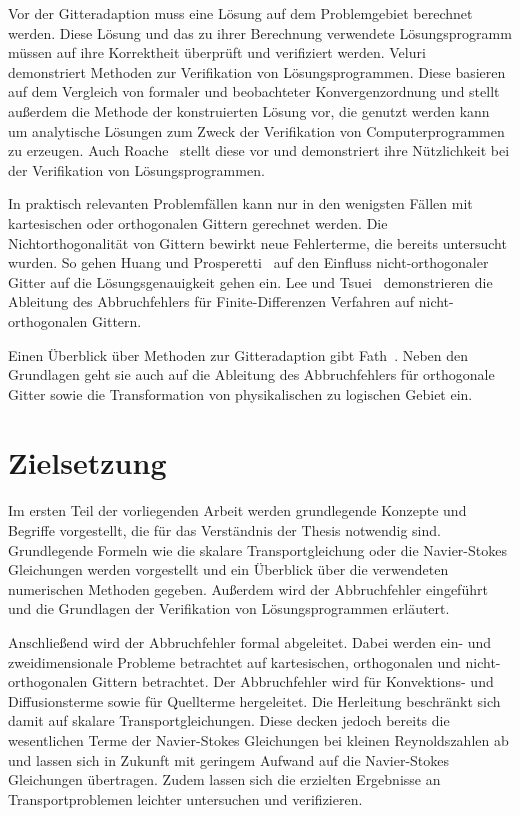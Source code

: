 Vor der Gitteradaption muss eine Lösung auf dem Problemgebiet berechnet werden. Diese
Lösung und das zu ihrer Berechnung verwendete Lösungsprogramm müssen
auf ihre Korrektheit überprüft und verifiziert werden. Veluri~\cite{veluri} demonstriert
Methoden zur Verifikation von Lösungsprogrammen. Diese basieren auf dem Vergleich von formaler und beobachteter
Konvergenzordnung und stellt außerdem die Methode der konstruierten Lösung vor, die genutzt werden kann
um analytische Lösungen zum Zweck der Verifikation von Computerprogrammen zu erzeugen.
Auch Roache~\cite{roache} stellt diese vor und demonstriert ihre Nützlichkeit bei der Verifikation von
Lösungsprogrammen.

In praktisch relevanten Problemfällen kann nur in den wenigsten Fällen mit
kartesischen oder orthogonalen Gittern gerechnet werden. Die Nichtorthogonalität
von Gittern bewirkt neue Fehlerterme, die bereits untersucht wurden. So gehen
Huang und Prosperetti~\cite{grid_ortho} auf den Einfluss nicht-orthogonaler Gitter
auf die Lösungsgenauigkeit gehen 
ein. Lee und Tsuei~\cite{lee} demonstrieren die Ableitung des Abbruchfehlers für Finite-Differenzen Verfahren
auf nicht-orthogonalen Gittern.

Einen Überblick über Methoden zur Gitteradaption gibt Fath~\cite{fath}.
Neben den Grundlagen geht sie auch auf die Ableitung des Abbruchfehlers für
orthogonale Gitter sowie die Transformation von physikalischen zu logischen Gebiet ein.



\section{Zielsetzung}

Im ersten Teil der vorliegenden Arbeit werden grundlegende Konzepte und Begriffe vorgestellt,
die für das Verständnis der Thesis notwendig sind. Grundlegende Formeln wie
die skalare Transportgleichung oder die Navier-Stokes Gleichungen werden vorgestellt
und ein Überblick über die verwendeten numerischen Methoden gegeben. Außerdem
wird der Abbruchfehler eingeführt und die Grundlagen der Verifikation von
Lösungsprogrammen erläutert.

Anschließend wird der Abbruchfehler formal
abgeleitet. Dabei werden ein- und zweidimensionale Probleme betrachtet auf kartesischen, orthogonalen
und nicht-orthogonalen Gittern betrachtet. Der Abbruchfehler wird für Konvektions-
und Diffusionsterme sowie für Quellterme hergeleitet. Die Herleitung beschränkt sich damit auf
skalare Transportgleichungen. Diese decken jedoch bereits die wesentlichen Terme der Navier-Stokes Gleichungen
bei kleinen Reynoldszahlen
ab und lassen sich in Zukunft mit geringem Aufwand auf die Navier-Stokes Gleichungen übertragen.
Zudem lassen sich die erzielten Ergebnisse an Transportproblemen leichter untersuchen und verifizieren.

